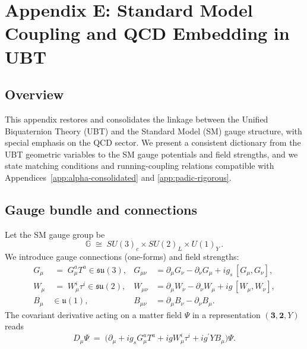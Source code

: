 \section{Appendix E: Standard Model Coupling and QCD Embedding in UBT}
\label{app:sm-qcd-ubt}

\subsection{Overview}
This appendix restores and consolidates the linkage between the Unified Biquaternion Theory (UBT) and the
Standard Model (SM) gauge structure, with special emphasis on the QCD sector. We present a consistent dictionary
from the UBT geometric variables to the SM gauge potentials and field strengths, and we state matching conditions
and running-coupling relations compatible with Appendices~\ref{app:alpha-consolidated} and \ref{app:padic-rigorous}.

\subsection{Gauge bundle and connections}
Let the SM gauge group be
\[
\mathbb{G} \;\cong\; SU(3)_c \times SU(2)_L \times U(1)_Y\,.
\]
We introduce gauge connections (one-forms) and field strengths:
\begin{align}
G_\mu &\;=\; G_\mu^a T^a \in \mathfrak{su}(3), &
G_{\mu\nu} &= \partial_\mu G_\nu - \partial_\nu G_\mu + i g_s\,[G_\mu, G_\nu], \\
W_\mu &\;=\; W_\mu^i \tau^i \in \mathfrak{su}(2), &
W_{\mu\nu} &= \partial_\mu W_\nu - \partial_\nu W_\mu + i g\,[W_\mu, W_\nu], \\
B_\mu &\in \mathfrak{u}(1), &
B_{\mu\nu} &= \partial_\mu B_\nu - \partial_\nu B_\mu.
\end{align}
The covariant derivative acting on a matter field $\Psi$ in a representation $(\mathbf{3},\mathbf{2},Y)$ reads
\begin{equation}
D_\mu \Psi \;=\; \Big(\partial_\mu + i g_s G_\mu^a T^a + i g W_\mu^i \tau^i + i g^\prime Y B_\mu\Big)\Psi.
\end{equation}

